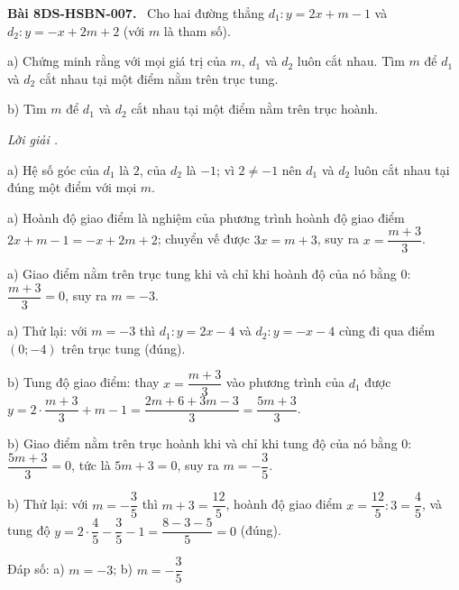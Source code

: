 \documentclass[12pt,a4paper]{article}
\newenvironment{problem}[1][]{\par\medskip\noindent\textbf{Bài #1.}\ }{\par}
\newenvironment{solution}[1][]{\par\noindent\textit{Lời giải #1.}\par}{\par}
\begin{document}
\begin{problem}[8DS-HSBN-007]
Cho hai đường thẳng $d_1: y = 2x + m - 1$ và $d_2: y = -x + 2m + 2$ (với $m$ là tham số).

a) Chứng minh rằng với mọi giá trị của $m$, $d_1$ và $d_2$ luôn cắt nhau. Tìm $m$ để $d_1$ và $d_2$ cắt nhau tại một điểm nằm trên trục tung.

b) Tìm $m$ để $d_1$ và $d_2$ cắt nhau tại một điểm nằm trên trục hoành.

\begin{solution}
a) Hệ số góc của $d_1$ là $2$, của $d_2$ là $-1$; vì $2 \neq -1$ nên $d_1$ và $d_2$ luôn cắt nhau tại đúng một điểm với mọi $m$.

a) Hoành độ giao điểm là nghiệm của phương trình hoành độ giao điểm $2x + m - 1 = -x + 2m + 2$; chuyển vế được $3x = m + 3$, suy ra $x = \dfrac{m + 3}{3}$.

a) Giao điểm nằm trên trục tung khi và chỉ khi hoành độ của nó bằng $0$: $\dfrac{m + 3}{3} = 0$, suy ra $m = -3$.

a) Thử lại: với $m = -3$ thì $d_1: y = 2x - 4$ và $d_2: y = -x - 4$ cùng đi qua điểm $(0; -4)$ trên trục tung (đúng).

b) Tung độ giao điểm: thay $x = \dfrac{m + 3}{3}$ vào phương trình của $d_1$ được $y = 2 \cdot \dfrac{m + 3}{3} + m - 1 = \dfrac{2m + 6 + 3m - 3}{3} = \dfrac{5m + 3}{3}$.

b) Giao điểm nằm trên trục hoành khi và chỉ khi tung độ của nó bằng $0$: $\dfrac{5m + 3}{3} = 0$, tức là $5m + 3 = 0$, suy ra $m = -\dfrac{3}{5}$.

b) Thử lại: với $m = -\dfrac{3}{5}$ thì $m + 3 = \dfrac{12}{5}$, hoành độ giao điểm $x = \dfrac{12}{5} : 3 = \dfrac{4}{5}$, và tung độ $y = 2 \cdot \dfrac{4}{5} - \dfrac{3}{5} - 1 = \dfrac{8 - 3 - 5}{5} = 0$ (đúng).

Đáp số: a) $\boxed{m = -3}$; b) $\boxed{m = -\dfrac{3}{5}}$
\end{solution}
\end{problem}
\end{document}
